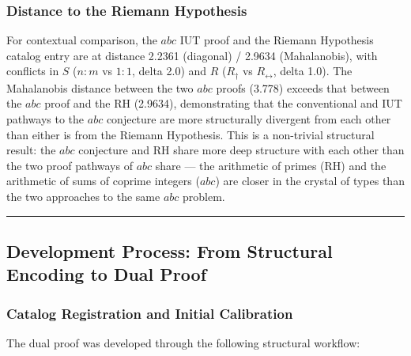 \documentclass[12pt,a4paper]{article}
\begin{document}
\subsubsection{Distance to the Riemann Hypothesis}

For contextual comparison, the $abc$ IUT proof and the Riemann Hypothesis catalog entry are at distance 2.2361 (diagonal) / 2.9634 (Mahalanobis), with conflicts in $S$ ($n{:}m$ vs $1{:}1$, delta 2.0) and $R$ ($R_{\dagger}$ vs $R_{\leftrightarrow}$, delta 1.0). The Mahalanobis distance between the two $abc$ proofs (3.778) exceeds that between the $abc$ proof and the RH (2.9634), demonstrating that the conventional and IUT pathways to the $abc$ conjecture are more structurally divergent from each other than either is from the Riemann Hypothesis. This is a non-trivial structural result: the $abc$ conjecture and RH share more deep structure with each other than the two proof pathways of $abc$ share --- the arithmetic of primes (RH) and the arithmetic of sums of coprime integers ($abc$) are closer in the crystal of types than the two approaches to the same $abc$ problem.

\begin{center}
\rule{0.5\textwidth}{0.4pt}
\end{center}

\subsection{Development Process: From Structural Encoding to Dual Proof}

\subsubsection{Catalog Registration and Initial Calibration}

The dual proof was developed through the following structural workflow:
\end{document}
